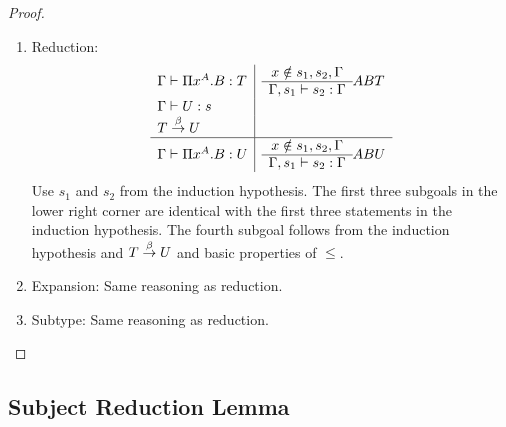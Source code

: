 \begin{theorem}
\begin{proof}
{\begin{enumerate}
\begin{enumerate}
                \item Reduction:
                $$
                \begin{array}{l|l}
                    \Gamma \vdash \Pi x^A.B : T
                    &
                    \begin{array}{c}  x \notin s_1, s_2, \Gamma  \\ \hline  \Gamma,s_1 \vdash s_2 : \Gamma \end{array} A B T
                    \\
                    \Gamma \vdash U: s
                    \\
                    T \stackrel{\beta}{\to} U
                    \\
                    \hline
                    \Gamma \vdash \Pi x^A.B : U
                    &
                    \begin{array}{c}  x \notin s_1, s_2, \Gamma  \\ \hline  \Gamma,s_1 \vdash s_2 : \Gamma \end{array} A B U
                \end{array}
                $$
                Use $s_1$ and $s_2$ from the induction hypothesis. The first
                    three subgoals in the lower right corner are identical with
                    the first three statements in the induction hypothesis. The
                    fourth subgoal follows from the induction hypothesis and $T
                    \stackrel{\beta}{\to} U$ and basic properties of $\le$.

                \item Expansion: Same reasoning as reduction.

                \item Subtype: Same reasoning as reduction.

            \end{enumerate}
        \end{enumerate}
        }
    \end{proof}
\end{theorem}





\subsection{Subject Reduction Lemma}

